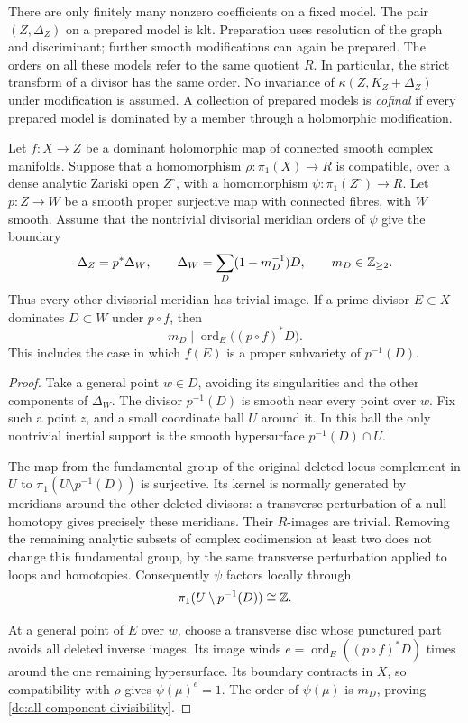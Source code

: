 There are only finitely many nonzero coefficients on a fixed model.
The pair \((Z,\Delta_Z)\) on a prepared model is klt. Preparation
uses resolution of the graph and discriminant; further smooth
modifications can again be prepared. The orders on all these models
refer to the same quotient \(R\). In particular, the strict transform
of a divisor has the same order. No invariance of
\(\kappa(Z,K_Z+\Delta_Z)\) under modification is assumed.
A collection of prepared models is \emph{cofinal} if every prepared
model is dominated by a member through a holomorphic modification.

\begin{lemma}
\label{de:inertia-divisibility}
Let \(f:X\to Z\) be a dominant holomorphic map of connected smooth
complex manifolds. Suppose that a homomorphism
\(\rho:\pi_1(X)\to R\) is compatible, over a dense analytic
Zariski open \(Z^\circ\), with a homomorphism
\(\psi:\pi_1(Z^\circ)\to R\). Let \(p:Z\to W\) be a smooth
proper surjective map with connected fibres, with \(W\) smooth.
Assume that the nontrivial divisorial meridian orders of \(\psi\)
give the boundary
\[
 \Delta_Z=p^*\Delta_W,
 \qquad
 \Delta_W=\sum_D(1-m_D^{-1})D,
 \qquad m_D\in\mathbb Z_{\ge2}.
\]
Thus every other divisorial meridian has trivial image. If a prime
divisor \(E\subset X\) dominates \(D\subset W\) under
\(p\circ f\), then
\begin{equation}\label{de:all-component-divisibility}
 m_D\mid \operatorname{ord}_E\bigl((p\circ f)^*D\bigr).
\end{equation}
This includes the case in which \(f(E)\) is a proper subvariety of
\(p^{-1}(D)\).
\end{lemma}

\begin{proof}
Take a general point \(w\in D\), avoiding its singularities and the
other components of \(\Delta_W\). The divisor \(p^{-1}(D)\) is
smooth near every point over \(w\). Fix such a point \(z\), and a
small coordinate ball \(U\) around it. In this ball the only
nontrivial inertial support is the smooth hypersurface
\(p^{-1}(D)\cap U\).

The map from the fundamental group of the original deleted-locus
complement in \(U\) to
\(\pi_1(U\setminus p^{-1}(D))\) is surjective. Its kernel is
normally generated by meridians around the other deleted divisors:
a transverse perturbation of a null homotopy gives precisely these
meridians. Their \(R\)-images are trivial. Removing the remaining
analytic subsets of complex codimension at least two does not change
this fundamental group, by the same transverse perturbation applied
to loops and homotopies. Consequently \(\psi\) factors locally
through
\[
 \pi_1(U\setminus p^{-1}(D))\cong\mathbb Z.
\]

At a general point of \(E\) over \(w\), choose a transverse disc
whose punctured part avoids all deleted inverse images. Its image
winds
\(e=\operatorname{ord}_E((p\circ f)^*D)\) times around the one
remaining hypersurface. Its boundary contracts in \(X\), so
compatibility with \(\rho\) gives \(\psi(\mu)^e=1\). The
order of \(\psi(\mu)\) is \(m_D\), proving
\eqref{de:all-component-divisibility}.
\end{proof}

